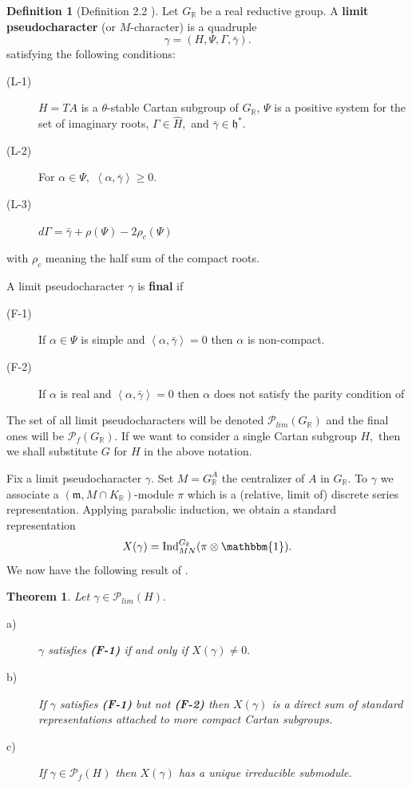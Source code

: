 \documentclass[letterpaper,twosided,11pt]{article}
\theoremstyle{plain}
\newtheorem{theorem}{Theorem}[section]
\theoremstyle{definition}
\newtheorem{definition}{Definition}
\theoremstyle{remark}
\newcommand{\R}{\mathbb{R}}
\newcommand{\ip}[1]{\left \langle #1 \right \rangle}
\newcommand{\script}[1]{\mathscr{#1}}
\newcommand{\tensor}{\otimes}
\newcommand{\Ind}{\operatorname{Ind}}
\newcommand{\lie}[1]{\mathfrak{#1}}
\begin{document}
		\begin{definition}[Definition 2.2 \cite{Vogan1984}]
			Let $G_\R$ be a real reductive group. A \textbf{limit pseudocharacter} (or $M$-character) is a quadruple \[ \gamma=(H,\Psi, \Gamma,\bar{\gamma}).\]
			satisfying the following conditions: 
			\begin{description} 
				\item[(L-1)] $H=TA$ is a $\theta$-stable Cartan subgroup of $G_\R$, $\Psi$ is a positive system for the set of imaginary roots, $\Gamma\in \widehat{H},$ and $\bar{\gamma}\in \lie{h}^*.$  
				\item[(L-2)] For $\alpha\in \Psi,$ $\ip{\alpha,\bar{\gamma}}\geq 0.$ 
				\item[(L-3)] $d\Gamma=\bar{\gamma}+\rho(\Psi)-2\rho_c(\Psi)$
			\end{description} 
			with $\rho_c$ meaning the half sum of the compact roots. 
			
			A limit pseudocharacter $\gamma$ is \textbf{final} if 
			\begin{description} 
				\item[(F-1)] If $\alpha\in \Psi$ is simple and $\ip{\alpha,\bar{\gamma}}=0$ then $\alpha$ is non-compact. 
				\item[(F-2)] If $\alpha$ is real and $\ip{\alpha,\bar{\gamma}}=0$ then $\alpha$ does not satisfy the parity condition of \cite[Definition 8.3.11]{Vogan1981}
			\end{description} 
			The set of all limit pseudocharacters will be denoted $\script{P}_{lim}(G_\R)$ and the final ones will be $\script{P}_f(G_\R).$ If we want to consider a single Cartan subgroup $H,$ then we shall substitute $G$ for $H$ in the above notation. 
		\end{definition}  
		
		Fix a limit pseudocharacter $\gamma.$ Set $M=G_\R^A$ the centralizer of $A$ in $G_\R.$ To $\gamma$ we associate a $(\lie{m},M\cap K_\R)$-module $\pi$ which is a (relative, limit of) discrete series representation. Applying parabolic induction, we obtain a standard representation \[ X(\gamma)=\Ind_{MN}^{G_\R}(\pi \tensor \mathbbm{1}).\] 
		We now have the following result of \cite{SpehVogan1980}. 
		
		\begin{theorem} 
			Let $\gamma\in \script{P}_{lim}(H).$ 
			\begin{description}
				\item[a)] $\gamma$ satisfies \textbf{(F-1)} if and only if $X(\gamma)\neq 0.$ 
				\item[b)] If $\gamma$ satisfies \textbf{(F-1)} but not \textbf{(F-2)} then $X(\gamma)$ is a direct sum of standard representations attached to more compact Cartan subgroups. 
				\item[c)] If $\gamma\in \script{P}_f(H)$ then $X(\gamma)$ has a unique irreducible submodule. 
			\end{description} 
		\end{theorem} 	
		
\end{document}
